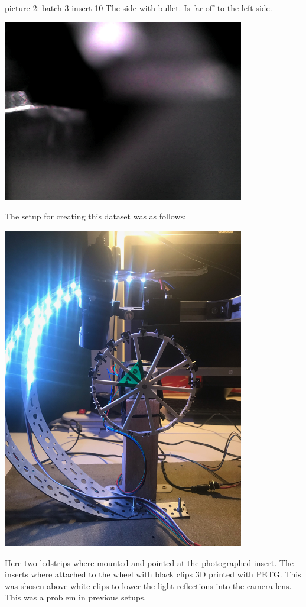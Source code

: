 \documentclass{scrartcl}
\begin{document}
picture 2: batch 3 insert 10 The side with bullet. Is far off to the left side.

\includegraphics[width=4.166667in, keepaspectratio=true]{./1_Birthday_dataset/b_003_p_010_l_000_b.png}



The setup for creating this dataset was as follows:

\includegraphics[width=4.166667in, keepaspectratio=true]{./1_Birthday_dataset/IMG_9282.jpeg}

Here two ledstrips where mounted and pointed at the photographed insert. The inserts where attached to the wheel with black clips 3D printed with PETG. This was shosen above white clips to lower the light reflections into the camera lens. This was a problem in previous setups. 
\end{document}
